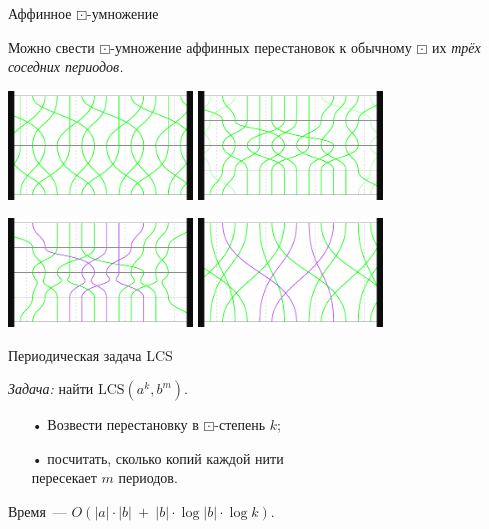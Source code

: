 \documentclass[svgnames]{beamer}
\begin{document}
\begin{frame}{Аффинное \(\boxdot\)-умножение}

Можно свести \(\boxdot\)-умножение аффинных перестановок к обычному \(\boxdot\) их {\it трёх соседних периодов.}

\begin{center}
  \includegraphics[width=4.9cm]{img-fg/PQ-base} \hspace{4mm}
  \includegraphics[width=4.9cm]{img-fg/PQ-GF3n} \vspace{2mm}

  \includegraphics[width=4.9cm]{img-fg/PQ-GF3n-untg} \hspace{4mm}
  \includegraphics[width=4.9cm]{img-fg/PQ-GF3n-z}  
\end{center}

\end{frame}


\begin{frame}{Периодическая задача LCS}

\begin{block}{\vspace*{-3ex}}
{\it Задача:} найти \(\mathrm{LCS} (a^k, b^m)\).
\end{block} \vspace{4mm}

\begin{itemize}
  \item[•] Возвести перестановку в \(\boxdot\)-степень \(k\);
  \item[•] посчитать, сколько копий каждой нити \\ пересекает \(m\) периодов.
\end{itemize} \vspace{4mm}

Время~— \(O (|a| \cdot |b|\ +\ |b| \cdot \log |b| \cdot \log k)\).

\end{frame}
\end{document}

